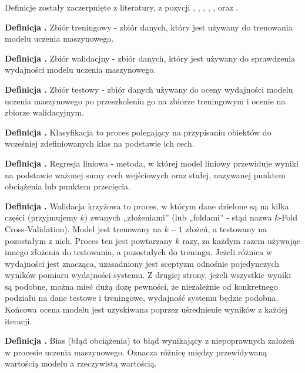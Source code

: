 Definicje zostały zaczerpnięte z literatury, z pozycji \cite{Fenner2020}, \cite{Geron2020},
\cite{Seenappa} , \cite{Goodfellow2016}, \cite{vanDerMaaten}, \cite{strGoogle} oraz \cite{strIbm}.

\noindent
\textbf{Definicja .}
\incrementdefinitionIndex
Zbiór treningowy - zbiór danych, który jest używany do trenowania modelu uczenia maszynowego.

\noindent
\textbf{Definicja .}
\incrementdefinitionIndex
Zbiór walidacjny - zbiór danych, który jest używany do sprawdzenia wydajności modelu uczenia maszynowego.

\noindent
\textbf{Definicja .}
\incrementdefinitionIndex
Zbiór testowy - zbiór danych używany do oceny wydajności modelu uczenia maszynowego
po przeszkoleniu go na zbiorze treningowym i ocenie na zbiorze walidacyjnym.

\noindent
\textbf{Definicja .}
\incrementdefinitionIndex
Klasyfikacja to proces polegający na przypisaniu obiektów do wcześniej zdefiniowanych klas na podstawie ich cech.

\noindent
\textbf{Definicja .}
\incrementdefinitionIndex
Regresja liniowa - metoda, w której model liniowy przewiduje wyniki na podstawie ważonej sumy cech wejściowych oraz stałej,
nazywanej punktem obciążenia lub punktem przecięcia.

\noindent
\textbf{Definicja .}
\incrementdefinitionIndex
Walidacja krzyżowa to proces, w którym dane dzielone są na kilka części (przyjmujemy $k$) zwanych „złożeniami”
(lub „foldami” - stąd nazwa $k$-Fold Cross-Validation). Model jest trenowany na $k-1$ złożeń, a testowany na pozostałym z nich.
Proces ten jest powtarzany $k$ razy, za każdym razem używając innego złożenia do testowania, a pozostałych do treningu.
Jeżeli różnica w wydajności jest znacząca, uzasadniony jest sceptyzm odnośnie pojedynczych wyników pomiaru wydajności systemu.
Z drugiej strony, jeżeli wszystkie wyniki są podobne, można mieć dużą dozę pewności, że niezależnie od konkretnego podziału
na dane testowe i treningowe, wydajność systemu będzie podobna.
Końcowa ocena modelu jest uzyskiwana poprzez uśrednienie wyników z każdej iteracji.

\noindent
\textbf{Definicja .}
\incrementdefinitionIndex
Bias (błąd obciążenia) to błąd wynikający z niepoprawnych założeń w procesie uczenia maszynowego.
Oznacza różnicę między przewidywaną wartością modelu a rzeczywistą wartością.

